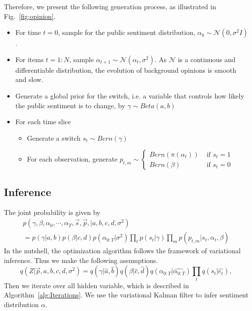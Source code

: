 \documentclass[runningheads]{llncs}
\newcommand{\Gaussian}{\mathcal{N}}
\begin{document}
Therefore, we present the following generation process, as illustrated in Fig.~\ref{fig:opinion}.
\vspace{-0.6cm}
\begin{itemize}
\item For time $t=0$, sample  for the public sentiment distribution, $\alpha_0\sim \Gaussian(0,\sigma^2 I)$.
\item For items $t=1: N$, sample $\alpha_{t+1}\sim \Gaussian(\alpha_t,\sigma^2)$. As $\Gaussian$ is a continuous and differentiable distribution, the evolution of background opinions is smooth and slow.
\item Generate a global prior for the switch, i.e. a variable that controls how likely the public sentiment is to change, by $\gamma\sim Beta(a,b)$
\end{itemize}
\begin{itemize}
\item For each time slice
\begin{itemize}
\item Generate a switch $s_t \sim Bern(\gamma)$
\item For each observation, generate $p_{t,m}\sim \begin{cases}
Bern(\pi(\alpha_t)) & \text{ if } s_{t}= 1\\ 
Bern(\beta) & \text{ if } s_{t}= 0 
\end{cases}$
\end{itemize}
\end{itemize}
\vspace{-0.6cm}

\subsection{Inference}
The joint probability is given by
\begin{multline}
    p(\gamma,\beta,\alpha_0,\cdots,\alpha_T, \vec{s},\vec{p}, |a,b,c,d,\sigma^2) \\
    =    p(\gamma|a,b) p(\beta|c,d)  p(\alpha_{0:T}|\sigma^2) \prod_t  p(s_{t}|\gamma) \prod_m p(p_{t,m}|s_{t},\alpha_t,\beta) 
\end{multline}
In the nutshell, the optimization algorithm follows the framework of variational inference. Thus we make the following assumptions. 
\begin{equation*}
q(Z|\vec{p},a,b,c,d,\sigma^2) = q(\gamma|\hat{a},\hat{b}) q(\beta|\hat{c},\hat{d}) q(\alpha_{0:T}|\hat{\alpha_{0:T}})\prod_{t} q(s_{t}|\hat{e_{t}}) , 
\end{equation*}
Then we iterate over all hidden variable, which is described in Algorithm~\ref{alg:Iterations}. We use the variational Kalman filter to infer sentiment distribution $\alpha$.
\end{document}
